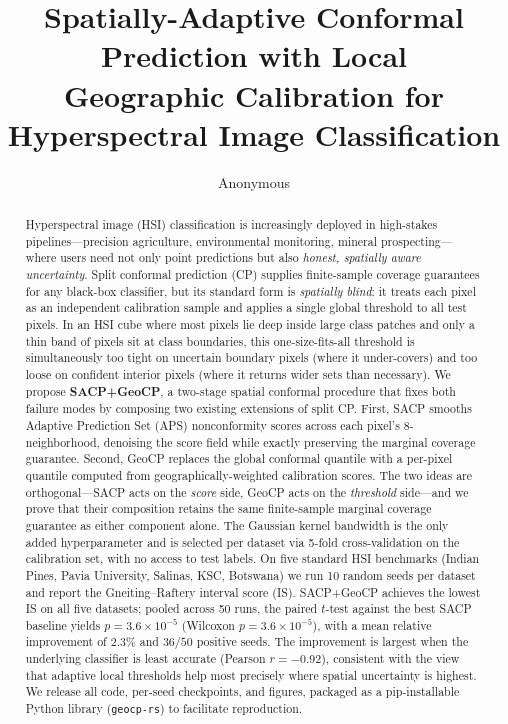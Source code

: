 \documentclass[11pt]{article}
\title{\bfseries Spatially-Adaptive Conformal Prediction with Local\\
Geographic Calibration for Hyperspectral Image Classification}
\author[1]{Anonymous}
\affil[1]{Anonymous}
\date{}
\newcommand{\1}{\mathbf{1}}
\begin{document}
\maketitle

\begin{abstract}
Hyperspectral image (HSI) classification is increasingly deployed in high-stakes pipelines---precision agriculture, environmental monitoring, mineral prospecting---where users need not only point predictions but also \emph{honest, spatially aware uncertainty}. Split conformal prediction (CP) supplies finite-sample coverage guarantees for any black-box classifier, but its standard form is \emph{spatially blind}: it treats each pixel as an independent calibration sample and applies a single global threshold to all test pixels. In an HSI cube where most pixels lie deep inside large class patches and only a thin band of pixels sit at class boundaries, this one-size-fits-all threshold is simultaneously too tight on uncertain boundary pixels (where it under-covers) and too loose on confident interior pixels (where it returns wider sets than necessary). We propose \textbf{SACP+GeoCP}, a two-stage spatial conformal procedure that fixes both failure modes by composing two existing extensions of split CP. First, SACP \citep{liu2024sacp} smooths Adaptive Prediction Set (APS) nonconformity scores across each pixel's 8-neighborhood, denoising the score field while exactly preserving the marginal coverage guarantee. Second, GeoCP \citep{lou2024geoconformal} replaces the global conformal quantile with a per-pixel quantile computed from geographically-weighted calibration scores. The two ideas are orthogonal---SACP acts on the \emph{score} side, GeoCP acts on the \emph{threshold} side---and we prove that their composition retains the same finite-sample marginal coverage guarantee as either component alone. The Gaussian kernel bandwidth is the only added hyperparameter and is selected per dataset via 5-fold cross-validation on the calibration set, with no access to test labels. On five standard HSI benchmarks (Indian Pines, Pavia University, Salinas, KSC, Botswana) we run 10 random seeds per dataset and report the Gneiting--Raftery interval score (IS). SACP+GeoCP achieves the lowest IS on all five datasets; pooled across 50 runs, the paired $t$-test against the best SACP baseline yields $p = 3.6 \times 10^{-5}$ (Wilcoxon $p = 3.6 \times 10^{-5}$), with a mean relative improvement of $2.3\%$ and $36/50$ positive seeds. The improvement is largest when the underlying classifier is least accurate (Pearson $r = -0.92$), consistent with the view that adaptive local thresholds help most precisely where spatial uncertainty is highest. We release all code, per-seed checkpoints, and figures, packaged as a pip-installable Python library (\texttt{geocp-rs}) to facilitate reproduction.
\end{abstract}
\end{document}
